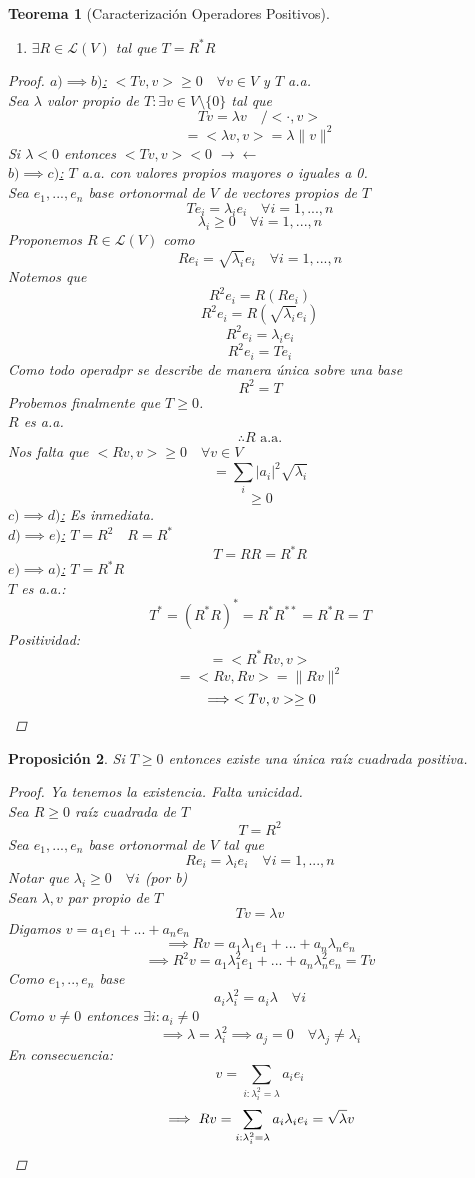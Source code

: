 \documentclass[11pt]{book}
\newcommand{\contr}{\rightarrow\leftarrow}
\newtheorem{thm}{Teorema}[section]
\newtheorem{prop}[thm]{Proposición}
\theoremstyle{definition}
\begin{document}
\begin{thm}[Caracterización Operadores Positivos]
\begin{enumerate}[label=\alph*)]
		\item $\exists R\in\mathcal{L}(V)$ tal que $T=R^*R$
	\end{enumerate}
	\begin{proof}
		\underline{$a)\implies b)$:} $<Tv,v>\geq 0\quad\forall v\in V$ y $T$ a.a.\\
		Sea $\lambda$ valor propio de $T:\exists v\in V\setminus\{0\}$ tal que
		\[Tv=\lambda v\quad/<\cdot,v>\]
		\[<Tv,v>=<\lambda v,v>=\lambda \|v\|^2\]
		Si $\lambda<0$ entonces $<Tv,v><0$ $\contr$\\
		\underline{$b)\implies c)$:} $T$ a.a. con valores propios mayores o iguales a 0.\\
		Sea $e_1,...,e_n$ base ortonormal de $V$ de vectores propios de $T$
		\[Te_i=\lambda_ie_i\quad\forall i=1,...,n\]
		\[\lambda_i\geq 0\quad\forall i=1,...,n\]
		Proponemos $R\in\mathcal{L}(V)$ como
		\[Re_i=\sqrt{\lambda_i}e_i\quad\forall i=1,...,n\]
		Notemos que
		\[R^2e_i=R(Re_i)\]
		\[R^2e_i=R(\sqrt{\lambda_i}e_i)\]
		\[R^2e_i=\lambda_ie_i\]
		\[R^2e_i=Te_i\]
		Como todo operadpr se describe de manera única sobre una base
		\[R^2=T\]
		Probemos finalmente que $T\geq 0$.\\
		$R$ es a.a.
		\[\therefore R\textrm{ a.a.}\]
		Nos falta que $<Rv,v>\geq 0\quad\forall v\in V$
		\[<Rv,v>=\sum_i |a_i|^2\sqrt{\lambda_i}\]
		\[<Rv,v>\geq 0\]
		\underline{$c)\implies d)$:} Es inmediata.\\
		\underline{$d)\implies e)$:} $T=R^2\quad R=R^*$
		\[T=RR=R^*R\]
		\underline{$e)\implies a)$:} $T=R^*R$\\
		$T$ es a.a.:
		\[T^*=(R^*R)^*=R^*R^{**}=R^*R=T\]
		Positividad:
		\[<Tv,v>=<R^*Rv,v>\]
		\[<Tv,v>=<Rv,Rv>=\|Rv\|^2\]
		\[\implies <Tv,v>\geq 0\qedhere\]
	\end{proof}
\end{thm}
\begin{prop}
	Si $T\geq 0$ entonces existe una única raíz cuadrada positiva.
	\begin{proof}
		Ya tenemos la existencia. Falta unicidad.\\
		Sea $R\geq 0$ raíz cuadrada de $T$
		\[T=R^2\]
		Sea $e_1,...,e_n$ base ortonormal de $V$ tal que
		\[Re_i=\lambda_ie_i\quad\forall i=1,...,n\]
		Notar que $\lambda_i\geq 0\quad\forall i$ (por b)\\
		Sean $\lambda,v$ par propio de $T$
		\[Tv=\lambda v\]
		Digamos $v=a_1e_1+...+a_ne_n$
		\[\implies Rv=a_1\lambda_1e_1+...+a_n\lambda_ne_n\]
		\[\implies R^2v=a_1\lambda_1^2e_1+...+a_n\lambda_n^2e_n=Tv\]
		Como $e_1,..,e_n$ base
		\[a_i\lambda_i^2=a_i\lambda\quad\forall i\]
		Como $v\neq 0$ entonces $\exists i: a_i\neq 0$
		\[\implies \lambda=\lambda_i^2\implies a_j=0\quad\forall\lambda_j\neq\lambda_i\]
		En consecuencia:
		\[v=\sum_{i:\lambda_i^2=\lambda}a_ie_i\]
		\[\implies Rv=\sum_{i:\lambda_i^2=\lambda}a_i\lambda_ie_i=\sqrt{\lambda}v\qedhere\]
	\end{proof}
\end{prop}
\end{document}
